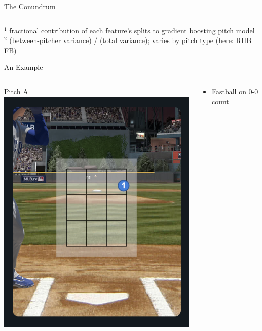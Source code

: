 \documentclass{beamer}
\begin{document}
\begin{frame}{The Conundrum}
\begin{columns}
\begin{column}{0.5\textwidth}
      \end{column}
    \end{columns}
    \scriptsize \color{ricegray}
    \vfill
    ${}^1$ fractional contribution of each feature's splits to gradient boosting pitch model\\
    ${}^2$ (between-pitcher variance) / (total variance); varies by pitch type (here: RHB FB)
  \end{frame}

  \begin{frame}{An Example}
    \begin{columns}
      \begin{column}{0.2\textwidth}
        \centering
        Pitch A\\
        \includegraphics[width = \textwidth]{images/pitch_on_edge}
      \end{column}
      \begin{column}{0.8\textwidth}
        \begin{itemize}
          \item Fastball on 0-0 count

\end{itemize}
\end{column}
\end{columns}
\end{frame}
\end{document}
